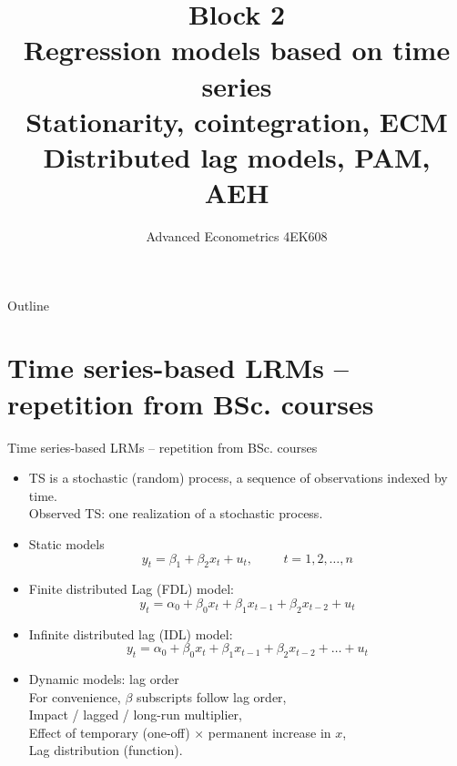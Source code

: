 \documentclass{beamer}
\title[Block 2]{Block 2 \\  Regression models based on time series\\ Stationarity, cointegration, ECM\\ Distributed lag models, PAM, AEH}
\author{Advanced Econometrics 4EK608}
\institute{Vysoká škola ekonomická v Praze}
\date{}
\begin{document}
 \begin{frame}
  \titlepage
\end{frame}
\begin{frame}{Outline}
  \tableofcontents
\end{frame}
\section{Time series-based LRMs -- repetition from BSc. courses}
\begin{frame}{Time series-based LRMs -- repetition from BSc. courses}
\begin{itemize}
  \item TS is a stochastic (random) process, a sequence of observations indexed by time. \\Observed TS: one realization of a stochastic process.
  \medskip
  \item Static models
  $$ y_t = \beta_1 + \beta_2 x_t + u_t , \hspace{1cm} t = 1, 2,  \dots, n $$
  \item Finite distributed Lag (FDL) model:
  $$ y_t = \alpha_0 + \beta_0 x_t + \beta_1 x_{t-1} + \beta_2 x_{t-2} + u_t $$
  \item Infinite distributed lag (IDL) model:
  $$ y_t = \alpha_0 + \beta_0 x_t + \beta_1 x_{t-1} + \beta_2 x_{t-2} + \dots + u_t $$
  \item   Dynamic models: lag order\\ For convenience, $\beta$ subscripts follow lag order, \\
  Impact / lagged / long-run multiplier, \\
  Effect of temporary (one-off) $\times$ permanent increase in $x$, \\
  Lag distribution (function).
\end{itemize}
\end{frame}
\end{document}
